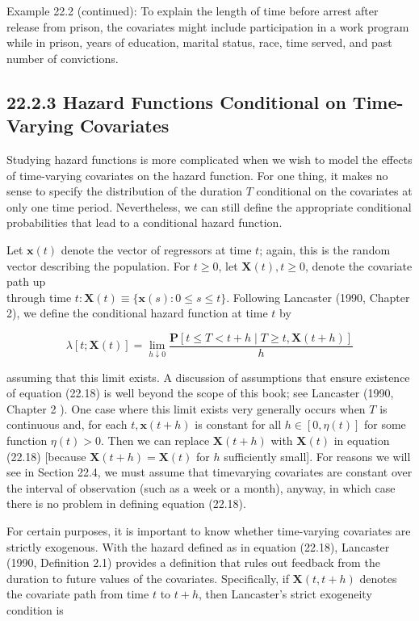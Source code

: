 \documentclass[10pt]{article}
\begin{document}
Example 22.2 (continued): To explain the length of time before arrest after release from prison, the covariates might include participation in a work program while in prison, years of education, marital status, race, time served, and past number of convictions.

\subsection*{22.2.3 Hazard Functions Conditional on Time-Varying Covariates}
Studying hazard functions is more complicated when we wish to model the effects of time-varying covariates on the hazard function. For one thing, it makes no sense to specify the distribution of the duration $T$ conditional on the covariates at only one time period. Nevertheless, we can still define the appropriate conditional probabilities that lead to a conditional hazard function.

Let $\mathbf{x}(t)$ denote the vector of regressors at time $t$; again, this is the random vector describing the population. For $t \geq 0$, let $\mathbf{X}(t), t \geq 0$, denote the covariate path up\\
through time $t: \mathbf{X}(t) \equiv\{\mathbf{x}(s): 0 \leq s \leq t\}$. Following Lancaster (1990, Chapter 2), we define the conditional hazard function at time $t$ by


\begin{equation*}
\lambda[t ; \mathbf{X}(t)]=\lim _{h \downarrow 0} \frac{\mathbf{P}[t \leq T<t+h \mid T \geq t, \mathbf{X}(t+h)]}{h} \tag{22.18}
\end{equation*}


assuming that this limit exists. A discussion of assumptions that ensure existence of equation (22.18) is well beyond the scope of this book; see Lancaster (1990, Chapter 2 ). One case where this limit exists very generally occurs when $T$ is continuous and, for each $t, \mathbf{x}(t+h)$ is constant for all $h \in[0, \eta(t)]$ for some function $\eta(t)>0$. Then we can replace $\mathbf{X}(t+h)$ with $\mathbf{X}(t)$ in equation (22.18) [because $\mathbf{X}(t+h)=\mathbf{X}(t)$ for $h$ sufficiently small]. For reasons we will see in Section 22.4, we must assume that timevarying covariates are constant over the interval of observation (such as a week or a month), anyway, in which case there is no problem in defining equation (22.18).

For certain purposes, it is important to know whether time-varying covariates are strictly exogenous. With the hazard defined as in equation (22.18), Lancaster (1990, Definition 2.1) provides a definition that rules out feedback from the duration to future values of the covariates. Specifically, if $\mathbf{X}(t, t+h)$ denotes the covariate path from time $t$ to $t+h$, then Lancaster's strict exogeneity condition is
\end{document}
